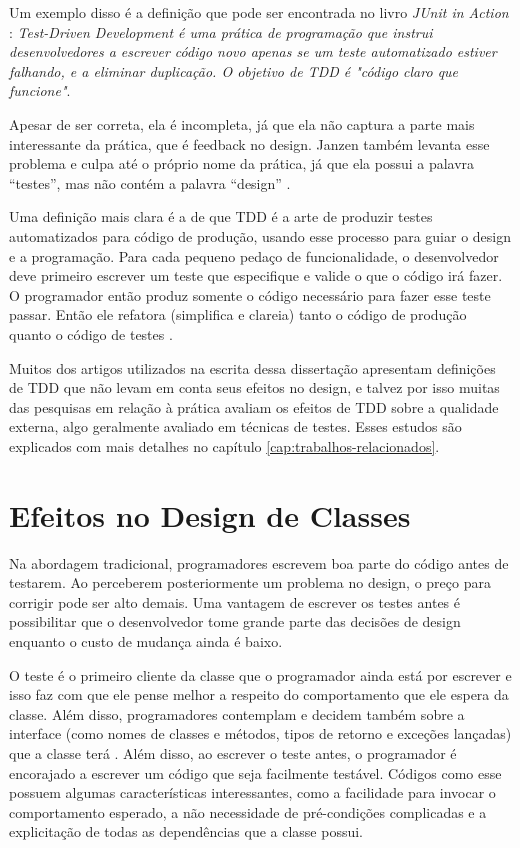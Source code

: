 Um exemplo disso é a definição que pode ser encontrada no livro \textit{JUnit
in Action} \cite{junit-in-action}: \textit{Test-Driven Development é uma
prática de programação que instrui desenvolvedores a escrever código novo
apenas se um teste automatizado estiver falhando, e a eliminar duplicação. O
objetivo de TDD é "código claro que funcione"}.

Apesar de ser correta, ela é incompleta, já que ela não captura a parte mais
interessante da prática, que é feedback no design. Janzen também levanta esse
problema e culpa até o próprio nome da prática, já que ela possui a palavra
``testes'', mas não contém a palavra ``design'' \cite{tdd-really-improve}.

Uma definição mais clara é a de que TDD é a arte de produzir testes
automatizados para código de produção, usando esse processo para guiar o design e a programação.
Para cada pequeno pedaço de funcionalidade, o desenvolvedor deve primeiro
escrever um teste que especifique e valide o que o código irá fazer. O
programador então produz somente o código necessário para fazer esse teste
passar. Então ele refatora (simplifica e clareia) tanto o código de produção
quanto o código de testes \cite{agilealliance-tdd} \cite{tdd-taxonomy}.

Muitos dos artigos utilizados na escrita dessa dissertação apresentam definições
de TDD que não levam em conta seus efeitos no design, e talvez por isso muitas das 
pesquisas em relação à prática avaliam os efeitos de TDD sobre a qualidade 
externa, algo geralmente avaliado em técnicas de testes. Esses estudos são 
explicados com mais detalhes no capítulo \ref{cap:trabalhos-relacionados}.

\section{Efeitos no Design de Classes}

Na abordagem tradicional, programadores escrevem boa parte do código antes de
testarem. Ao perceberem posteriormente um problema no design, o preço para
corrigir pode ser alto demais. Uma vantagem de escrever os testes antes é
possibilitar que o desenvolvedor tome grande parte das decisões de design
enquanto o custo de mudança ainda é baixo.

O teste é o primeiro cliente da
classe que o programador ainda está por escrever e isso faz com que ele pense
melhor a respeito do comportamento que ele espera da classe. Além disso,
programadores contemplam e decidem também sobre a interface (como nomes de
classes e métodos, tipos de retorno e exceções lançadas) que a classe terá
\cite{janzen-saiedian}.
Além disso, ao escrever o teste antes, o programador é encorajado a escrever um
código que seja facilmente testável. Códigos como esse possuem algumas
características interessantes, como a facilidade para invocar o comportamento
esperado, a não necessidade de pré-condições complicadas e a explicitação de
todas as dependências que a classe possui.

